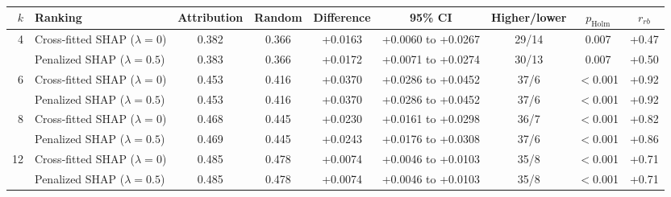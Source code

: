 \begin{table}[htbp]
\centering
\small
\caption{}
\label{tab:h2}
\setlength{\tabcolsep}{4pt}
\begin{adjustbox}{max width=\textwidth}
\begin{tabular}{rlccccccc}
\toprule
$k$ & Ranking & Attribution & Random & Difference & 95\% CI & Higher/lower & $p_{\mathrm{Holm}}$ & $r_{rb}$ \\
\midrule
4 & Cross-fitted SHAP ($\lambda = 0$) & 0.382 & 0.366 & +0.0163 & +0.0060 to +0.0267 & 29/14 & 0.007 & +0.47 \\
 & Penalized SHAP ($\lambda = 0.5$) & 0.383 & 0.366 & +0.0172 & +0.0071 to +0.0274 & 30/13 & 0.007 & +0.50 \\
\midrule 6 & Cross-fitted SHAP ($\lambda = 0$) & 0.453 & 0.416 & +0.0370 & +0.0286 to +0.0452 & 37/6 & $<$0.001 & +0.92 \\
 & Penalized SHAP ($\lambda = 0.5$) & 0.453 & 0.416 & +0.0370 & +0.0286 to +0.0452 & 37/6 & $<$0.001 & +0.92 \\
\midrule 8 & Cross-fitted SHAP ($\lambda = 0$) & 0.468 & 0.445 & +0.0230 & +0.0161 to +0.0298 & 36/7 & $<$0.001 & +0.82 \\
 & Penalized SHAP ($\lambda = 0.5$) & 0.469 & 0.445 & +0.0243 & +0.0176 to +0.0308 & 37/6 & $<$0.001 & +0.86 \\
\midrule 12 & Cross-fitted SHAP ($\lambda = 0$) & 0.485 & 0.478 & +0.0074 & +0.0046 to +0.0103 & 35/8 & $<$0.001 & +0.71 \\
 & Penalized SHAP ($\lambda = 0.5$) & 0.485 & 0.478 & +0.0074 & +0.0046 to +0.0103 & 35/8 & $<$0.001 & +0.71 \\
\bottomrule
\end{tabular}
\end{adjustbox}
\end{table}
